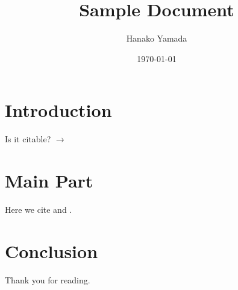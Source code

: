 \documentclass[a4paper]{article}
\begin{document}
\title{\huge Sample Document}
\author{Hanako Yamada}
\date{\today}
\maketitle

\section{Introduction}
Is it citable? $\to$ \citet{Haxby2425}

\section{Main Part}
Here we cite \citet{Mitchell1191} and \citet{Haxby2425}.

\section{Conclusion}
Thank you for reading.

% 
% 
% 

% 
% 

\newpage
\printbibliography

\newpage
\appendix

\end{document}
